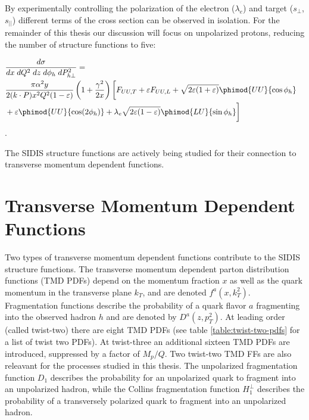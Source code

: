 By experimentally controlling the polarization of the electron ($\lambda_e$) and target ($s_{\perp}$, $s_{||}$) different terms of the cross section can be observed in isolation.  For the remainder of this thesis our discussion will focus on unpolarized protons, reducing the number of structure functions to five:  

\begin{eqnarray*} 
        \lefteqn{\frac{d\sigma}{dx \; dQ^2 \; dz \; d\phi_h \; dP_{h\perp}^2} = } \\
         & \frac{\pi \alpha^2 y}{2 (k \cdot P) x^2 Q^2 (1 - \varepsilon)} \left( 1 +
        \frac{\gamma^2}{2x}\right) \biggl[ F_{UU,T} + \varepsilon F_{UU,L} + \sqrt{2 \varepsilon (1 + \varepsilon)} \phimod{UU}{\cos\phi_h} \notag \\
        & + \varepsilon \phimod{UU}{\cos(2\phi_h)} + \lambda_e \sqrt{2 \varepsilon (1 - \varepsilon)} \phimod{LU}{\sin\phi_h} \biggr]
\end{eqnarray*}.

The SIDIS structure functions are actively being studied for their connection to transverse momentum dependent functions.

\section{Transverse Momentum Dependent Functions}
Two types of transverse momentum dependent functions contribute to the SIDIS structure functions.  The transverse momentum dependent parton distribution functions (TMD PDFs) depend on the momentum fraction $x$ as well as the quark momentum in the transverse plane $k_{T}$, and are denoted $f^a(x, k_{T}^2)$.  Fragmentation functions describe the probability of a quark flavor $a$ fragmenting into the observed hadron $h$ and are denoted by $D^{a}(z, p_{T}^{2})$.  At leading order (called twist-two) there are eight TMD PDFs (see table \ref{table:twist-two-pdfs} for a list of twist two PDFs).  At twist-three an additional sixteen TMD PDFs are introduced, suppressed by a factor of $M_p/Q$.  Two twist-two TMD FFs are also releavant for the processes studied in this thesis.  The unpolarized fragmentation function $D_1$ describes the probability for an unpolarized quark to fragment into an unpolarized hadron, while the Collins fragmentation function $H_{1}^{\perp}$ describes the probability of a transversely polarized quark to fragment into an unpolarized hadron.  

